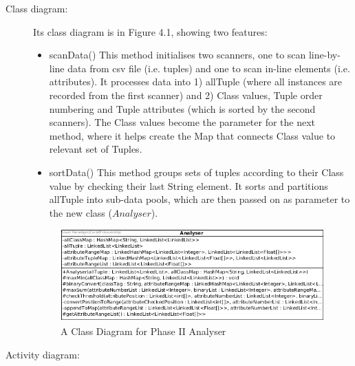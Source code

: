 \begin{description}
\item[Class diagram: ] 

Its class diagram is in Figure 4.1, showing two features:
\begin{itemize}
	\item scanData()
	This method initialises two scanners, one to scan line-by-line data from csv file (i.e. tuples) and one to scan in-line elements (i.e. attributes).
	It processes data into 1) allTuple (where all instances are recorded from the first scanner) and 2) Class values, Tuple order numbering and Tuple attributes (which is sorted by the second scanners).
	The Class values become the parameter for the next method, where it helps create the Map that connects Class value to relevant set of Tuples.
	\item sortData()
	This method groups sets of tuples according to their Class value by checking their last String element. It sorts and partitions allTuple into sub-data pools, which are then passed on as parameter to the new class ($Analyser$).
	
\end{itemize}

\begin{figure}[t]
    \centering
    \includegraphics[width=5in]{figures/class_analyser}
    \caption[A Class Diagram for Phase II Analyser]{A Class Diagram for Phase II Analyser}
    \label{fig:figure4_2}
\end{figure}

\item[Activity diagram: ] 
\end{description}






